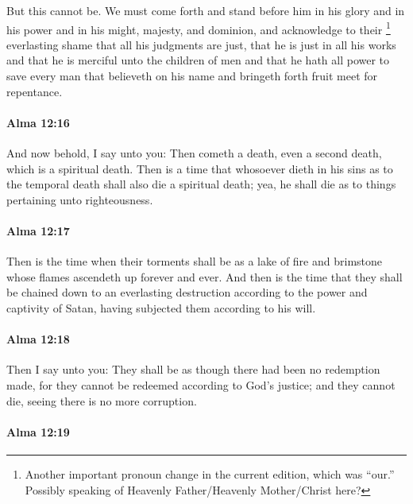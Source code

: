 			But this cannot be.
			We must come forth and stand before him
			in his glory and in his power and in his might, majesty, and dominion,
			and acknowledge to their%
				\footnote{%
					Another important pronoun change in the current edition, which was ``our.'' Possibly speaking of Heavenly Father/Heavenly Mother/Christ here?	 
					}
			everlasting shame that all his judgments are just,
			that he is just in all his works
			and that he is merciful unto the children of men
			and that he hath all power to save every man
			that believeth on his name and bringeth forth fruit meet for repentance.

		\paragraph{Alma 12:16} %
			\label{ALMA-12-16}

			And now behold, I say unto you:
			Then cometh a death, even a second death, which is a spiritual death.
			Then is a time that whosoever dieth in his sins as to the temporal death
			shall also die a spiritual death;
			yea, he shall die as to things pertaining unto righteousness.

		\paragraph{Alma 12:17} %
			\label{ALMA-12-17}

			Then is the time when their torments shall be as a lake of fire and brimstone
			whose flames ascendeth up forever and ever.
			And then is the time that they shall be chained down to an everlasting destruction
			according to the power and captivity of Satan,
			having subjected them according to his will.

		\paragraph{Alma 12:18} %
			\label{ALMA-12-18}

			Then I say unto you:
			They shall be as though there had been no redemption made,
			for they cannot be redeemed according to God's justice;
			and they cannot die,
			seeing there is no more corruption.

		\paragraph{Alma 12:19} %
			\label{ALMA-12-19}

